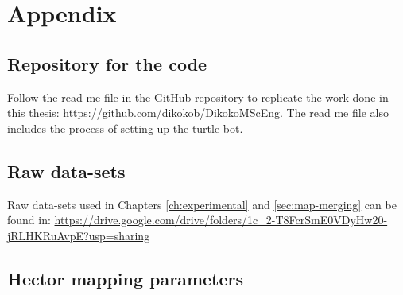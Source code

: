 \appendix
\chapter{Appendix}
\label{ch:appendix}
\section{Repository for the code}
\label{sec:appendix.python_solution}

Follow the read me file in the GitHub repository to replicate the work done in this thesis: \url{https://github.com/dikokob/DikokoMScEng}. The read me file also includes the process of setting up the turtle bot.

\section{Raw data-sets}
\label{sec:appendix.rawdata}

Raw data-sets used in Chapters \ref{ch:experimental} and \ref{sec:map-merging} can be found in: \url{https://drive.google.com/drive/folders/1c\_2-T8FcrSmE0VDyHw20-jRLHKRuAvpE?usp=sharing}

\section{Hector mapping parameters}
\label{sec:appendix.hector-mapping}


